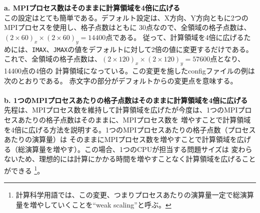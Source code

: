 {\bf a. MPIプロセス数はそのままに計算領域を4倍に広げる}\\

この設定はとても簡単である。デフォルト設定は、X方向、Y方向ともに2つのMPIプロセスを使用し、格子点数はともに
30点なので、全領域の格子点数は、$(2 \times 60)_{x} \times (2 \times 60)_{y} = 14400$点である。
従って、計算領域を4倍に広げるためには、\verb|IMAX|、\verb|JMAX|の値をデフォルトに対して2倍の値に変更するだけである。
これで、全領域の格子点数は、$(2 \times 120)_{x} \times (2 \times 120)_{y} = 57600$点となり、14400点の4倍の
計算領域になっている。この変更を施したconfigファイルの例は次のとおりである。
赤文字の部分がデフォルトからの変更点を意味する。\\

\\

\vspace{5mm}
{\bf b. 1つのMPIプロセスあたりの格子点数はそのままに計算領域を4倍に広げる}\\

先程は、MPIプロセス数を維持して計算領域を広げたが今度は、1つのMPIプロセスあたりの格子点数はそのままに、MPIプロセス数を
増やすことで計算領域を4倍に広げる方法を説明する。1つのMPIプロセスあたりの格子点数（プロセスあたりの演算量）は
そのままにMPIプロセス数を増やすことで計算領域を広げる（総演算量を増やす）。この場合、1つのCPUが担当する問題サイズは
変わらないため、理想的には計算にかかる時間を増やすことなく計算領域を広げることができる
\footnote{計算科学用語では、この変更、つまりプロセスあたりの演算量一定で総演算量を増やしていくことを``weak scaling''と呼ぶ。}。


